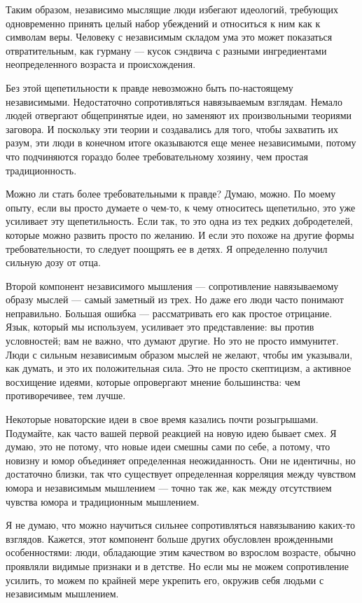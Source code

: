 \documentclass[ebook,12pt,oneside,openany]{memoir}
\begin{document}
Таким образом, независимо мыслящие люди избегают идеологий, требующих
одновременно принять целый набор убеждений и относиться к ним как к
символам веры. Человеку с независимым складом ума это может показаться
отвратительным, как гурману — кусок сэндвича с разными ингредиентами
неопределенного возраста и происхождения.

Без этой щепетильности к правде невозможно быть по-настоящему
независимыми. Недостаточно сопротивляться навязываемым взглядам.
Немало людей отвергают общепринятые идеи, но заменяют их произвольными
теориями заговора. И поскольку эти теории и создавались для того,
чтобы захватить их разум, эти люди в конечном итоге оказываются еще
менее независимыми, потому что подчиняются гораздо более
требовательному хозяину, чем простая традиционность.

Можно ли стать более требовательными к правде? Думаю, можно. По моему
опыту, если вы просто думаете о чем-то, к чему относитесь щепетильно,
это уже усиливает эту щепетильность. Если так, то это одна из тех
редких добродетелей, которые можно развить просто по желанию. И если
это похоже на другие формы требовательности, то следует поощрять ее в
детях. Я определенно получил сильную дозу от отца.

Второй компонент независимого мышления — сопротивление навязываемому
образу мыслей — самый заметный из трех. Но даже его люди часто
понимают неправильно. Большая ошибка — рассматривать его как простое
отрицание. Язык, который мы используем, усиливает это представление:
вы против условностей; вам не важно, что думают другие. Но это не
просто иммунитет. Люди с сильным независимым образом мыслей не желают,
чтобы им указывали, как думать, и это их положительная сила. Это не
просто скептицизм, а активное восхищение идеями, которые опровергают
мнение большинства: чем противоречивее, тем лучше.

Некоторые новаторские идеи в свое время казались почти розыгрышами.
Подумайте, как часто вашей первой реакцией на новую идею бывает смех.
Я думаю, это не потому, что новые идеи смешны сами по себе, а потому,
что новизну и юмор объединяет определенная неожиданность. Они не
идентичны, но достаточно близки, так что существует определенная
корреляция между чувством юмора и независимым мышлением — точно так
же, как между отсутствием чувства юмора и традиционным мышлением.

Я не думаю, что можно научиться сильнее сопротивляться навязыванию
каких-то взглядов. Кажется, этот компонент больше других обусловлен
врожденными особенностями: люди, обладающие этим качеством во взрослом
возрасте, обычно проявляли видимые признаки и в детстве. Но если мы не
можем сопротивление усилить, то можем по крайней мере укрепить его,
окружив себя людьми с независимым мышлением.
\end{document}

